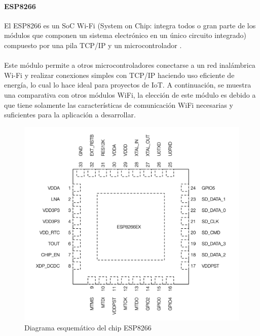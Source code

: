 \paragraph{ESP8266}
El ESP8266 es un SoC Wi-Fi \citep{MarcoTeorico7} (System on Chip: integra todos o gran parte de los módulos que componen un sistema electrónico en un único circuito integrado) compuesto por una pila TCP/IP y un microcontrolador \citep{MarcoTeorico8}.
\paragraph{}

Este módulo permite a otros microcontroladores conectarse a un red inalámbrica Wi-Fi y realizar conexiones simples con TCP/IP haciendo uso eficiente de energía, lo cual lo hace ideal para proyectos de IoT. A continuación, se muestra una comparativa con otros módulos WiFi, la elección de este módulo es debido a que tiene solamente las características de comunicación WiFi necesarias y suficientes para la aplicación a desarrollar.

\begin{figure}[H]
	\centering
	\includegraphics[scale=.3]{Capitulo2/images/esp8266.png}
	\caption{Diagrama esquemático del chip ESP8266}
	\label{fig:diagrama_dispensador}
\end{figure}

\pagebreak

